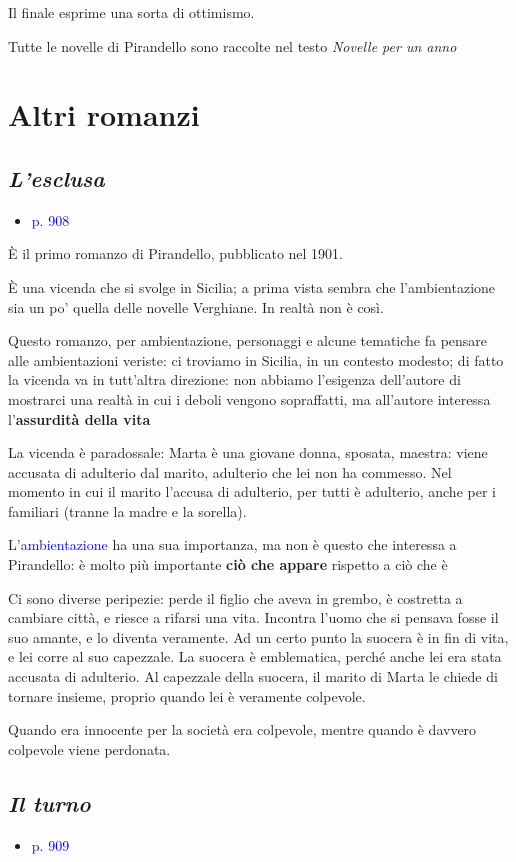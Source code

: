 \documentclass[a4paper, twoside, titlepage]{book}
\newcommand{\elenco}[1]{%
\begin{itemize}
#1
\end{itemize}}
\renewcommand{\emph}[1]{\textcolor{blue}{#1}}
\begin{document}
Il finale esprime una sorta di ottimismo.

Tutte le novelle di Pirandello sono raccolte nel testo \textit{Novelle per un anno}

\chapter{Altri romanzi}

\section{\textit{L'esclusa}}
\elenco{\item \emph{p. 908}
}

È il primo romanzo di Pirandello, pubblicato nel 1901.

È una vicenda che si svolge in Sicilia; a prima vista sembra che l'ambientazione sia un po' quella delle novelle Verghiane. In realtà non è così.

Questo romanzo, per ambientazione, personaggi e alcune tematiche fa pensare alle ambientazioni veriste: ci troviamo in Sicilia, in un contesto modesto; di fatto la vicenda va in tutt'altra direzione: non abbiamo l'esigenza dell'autore di mostrarci una realtà in cui i deboli vengono sopraffatti, ma all'autore interessa l'\textbf{assurdità della vita}

La vicenda è paradossale: Marta è una giovane donna, sposata, maestra: viene accusata di adulterio dal marito, adulterio che lei non ha commesso. Nel momento in cui il marito l'accusa di adulterio, per tutti è adulterio, anche per i familiari (tranne la madre e la sorella).

L'\emph{ambientazione} ha una sua importanza, ma non è questo che interessa a Pirandello: è molto più importante \textbf{ciò che appare} rispetto a ciò che è

Ci sono diverse peripezie: perde il figlio che aveva in grembo, è costretta a cambiare città, e riesce a rifarsi una vita.
Incontra l'uomo che si pensava fosse il suo amante, e lo diventa veramente.
Ad un certo punto la suocera è in fin di vita, e lei corre al suo capezzale. La suocera è emblematica, perché anche lei era stata accusata di adulterio.
Al capezzale della suocera, il marito di Marta le chiede di tornare insieme, proprio quando lei è veramente colpevole.

Quando era innocente per la società era colpevole, mentre quando è davvero colpevole viene perdonata.

\section{\textit{Il turno}}
\elenco{\item \emph{p. 909}}
\end{document}
